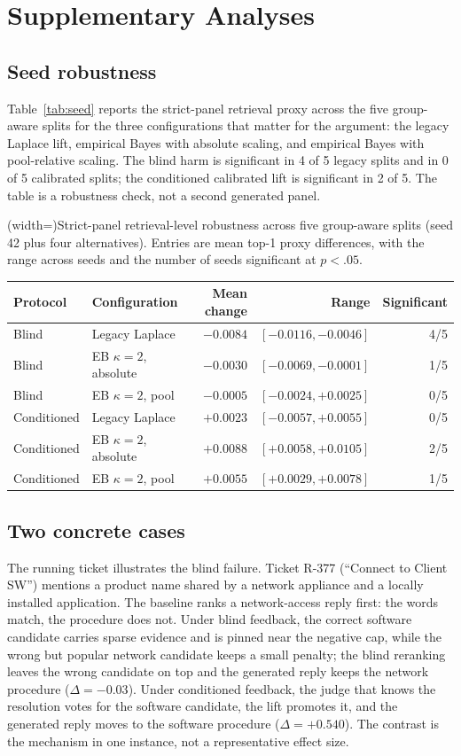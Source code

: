 \appendix
\section{Supplementary Analyses}
\label{sec:appendix}

\subsection{Seed robustness}
Table~\ref{tab:seed} reports the strict-panel retrieval proxy across the five
group-aware splits for the three configurations that matter for the argument: the
legacy Laplace lift, empirical Bayes with absolute scaling, and empirical Bayes with
pool-relative scaling. The blind harm is significant in 4 of 5 legacy splits and in
0 of 5 calibrated splits; the conditioned calibrated lift is significant in 2 of 5.
The table is a robustness check, not a second generated panel.

\Table[!btp](width=\textwidth){Strict-panel retrieval-level robustness across five
group-aware splits (seed 42 plus four alternatives). Entries are mean top-1 proxy
differences, with the range across seeds and the number of seeds significant at
$p<.05$.\label{tab:seed}}{
\begin{tabular}{@{}llrrr@{}}
\toprule
Protocol & Configuration & Mean change & Range & Significant \\
\midrule
Blind & Legacy Laplace & $-0.0084$ & $[-0.0116, -0.0046]$ & 4/5 \\
Blind & EB $\kappa=2$, absolute & $-0.0030$ & $[-0.0069, -0.0001]$ & 1/5 \\
Blind & EB $\kappa=2$, pool & $-0.0005$ & $[-0.0024, +0.0025]$ & 0/5 \\
Conditioned & Legacy Laplace & $+0.0023$ & $[-0.0057, +0.0055]$ & 0/5 \\
Conditioned & EB $\kappa=2$, absolute & $+0.0088$ & $[+0.0058, +0.0105]$ & 2/5 \\
Conditioned & EB $\kappa=2$, pool & $+0.0055$ & $[+0.0029, +0.0078]$ & 1/5 \\
\bottomrule
\end{tabular}}

\subsection{Two concrete cases}
The running ticket illustrates the blind failure. Ticket R-377 (``Connect to Client
SW'') mentions a product name shared by a network appliance and a locally installed
application. The baseline ranks a network-access reply first: the words match, the
procedure does not. Under blind feedback, the correct software candidate carries
sparse evidence and is pinned near the negative cap, while the wrong but popular
network candidate keeps a small penalty; the blind reranking leaves the wrong
candidate on top and the generated reply keeps the network procedure
($\Delta=-0.03$). Under conditioned feedback, the judge that knows the resolution
votes for the software candidate, the lift promotes it, and the generated reply
moves to the software procedure ($\Delta=+0.540$). The contrast is the mechanism in
one instance, not a representative effect size.

